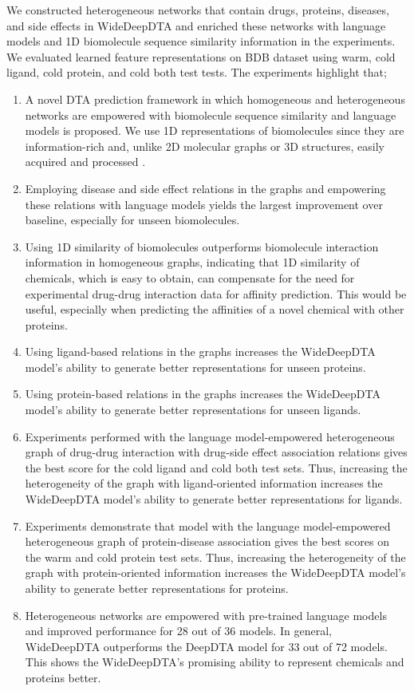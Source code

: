 We constructed heterogeneous networks that contain drugs, proteins, diseases, and side effects in WideDeepDTA and enriched these networks with language models and 1D biomolecule sequence similarity information in the experiments. We evaluated learned feature representations on BDB dataset using warm, cold ligand, cold protein, and cold both test tests. The experiments highlight that;

\begin{enumerate}
    \item A novel DTA prediction framework in which homogeneous and heterogeneous networks are empowered with biomolecule sequence similarity and language models is proposed. We use 1D representations of biomolecules since they are information-rich and, unlike 2D molecular graphs or 3D structures, easily acquired and processed \cite{flam2021keeping}.
    \item Employing disease and side effect relations in the graphs and empowering these relations with language models yields the largest improvement over baseline, especially for unseen biomolecules. 
    \item Using 1D similarity of biomolecules outperforms biomolecule interaction information in homogeneous graphs, indicating that 1D similarity of chemicals, which is easy to obtain, can compensate for the need for experimental drug-drug interaction data for affinity prediction. This would be useful, especially when predicting the affinities of a novel chemical with other proteins. 
    \item Using ligand-based relations in the graphs increases the WideDeepDTA model's ability to generate better representations for unseen proteins. 
    \item Using protein-based relations in the graphs increases the WideDeepDTA model's ability to generate better representations for unseen ligands.
    \item Experiments performed with the language model-empowered heterogeneous graph of drug-drug interaction with drug-side effect association relations gives the best score for the cold ligand and cold both test sets. Thus, increasing the heterogeneity of the graph with ligand-oriented information increases the WideDeepDTA model's ability to generate better representations for ligands. 
    \item Experiments demonstrate that model with the language model-empowered heterogeneous graph of protein-disease association gives the best scores on the warm and cold protein test sets. Thus, increasing the heterogeneity of the graph with protein-oriented information increases the WideDeepDTA model's ability to generate better representations for proteins.
    \item Heterogeneous networks are empowered with pre-trained language models and improved performance for 28 out of 36 models. In general, WideDeepDTA outperforms the DeepDTA model for 33 out of 72 models. This shows the WideDeepDTA's promising ability to represent chemicals and proteins better. 
\end{enumerate}




